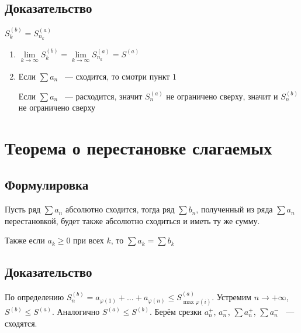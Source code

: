 \documentclass{article}
\begin{document}
        \subsection{Доказательство} 
            
            $S^{(b)}_k = S^{(a)}_{n_k}$
            
            \begin{enumerate}
            
                \item $\lim\limits_{k \rightarrow \infty} S^{(b)}_k = \lim\limits_{k \rightarrow \infty} S^{(a)}_{n_k} = S^{(a)}$
                
                \item Если $\sum a_n$ ~--- сходится, то смотри пункт $1$
                
                    Если $\sum a_n$ ~--- расходится, значит $S^{(a)}_n$ не ограничено сверху, значит и $S^{(b)}_n$ не ограничено сверху
            
            \end{enumerate}
            
    \newpage
    
    \section{Теорема о перестановке слагаемых}
    
        \subsection{Формулировка}
        
            Пусть ряд $\sum a_n$ абсолютно сходится, тогда ряд $\sum b_n$, полученный из ряда $\sum a_n$ перестановкой, будет также абсолютно сходиться и иметь ту же сумму.
            
            Также если $a_k \geq 0$ при всех $k$, то $\sum a_k = \sum b_k$
            
        \subsection{Доказательство}
        
            По определению $S_n^{(b)} = a_{\varphi(1)} + \ldots + a_{\varphi(n)} \leq S^{(a)}_{\max \varphi(i)}$. Устремим $n \rightarrow +\infty$, $S^{(b)} \leq S^{(a)}$. Аналогично $S^{(a)} \leq S^{(b)}$. Берём срезки $a_n^+$, $a_n^-$, $\sum a_n^+$, $\sum a_n^-$ ~--- сходятся.
            
\end{document}
